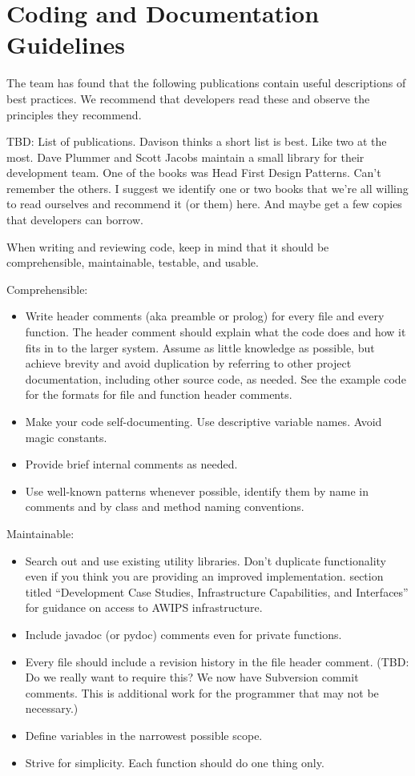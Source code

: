 
\chapter{Coding and Documentation Guidelines}


The team has found that the following publications contain 
useful descriptions of best practices.  We recommend that 
developers read these and observe the principles they
recommend.

TBD: List of publications.  Davison thinks a short list is
best.  Like two at the most.  Dave Plummer and Scott Jacobs 
maintain a small library for their development team.  One of
the books was Head First Design Patterns.  Can't remember
the others.  I suggest we identify one or two books that we're all 
willing to read ourselves and recommend it (or them) here.
And maybe get a few copies that developers can borrow.


When writing and reviewing code, keep in mind that it should
be comprehensible, maintainable, testable, and usable.

Comprehensible:
\begin{itemize}
\item
Write header comments (aka preamble or prolog) for every file and every
function.  The header comment should
explain what the code does and how it fits in to the larger system.
Assume as little knowledge as possible, but achieve brevity
and avoid duplication by referring to other project
documentation, including other source code, as needed.
See the example code for the formats for file and function 
header comments.
\item
Make your code self-documenting.  Use descriptive variable
names.  Avoid magic constants.
\item
Provide brief internal comments as needed.  
\item
Use well-known patterns whenever possible, identify them
by name in comments and by class and method naming
conventions.
\end{itemize}


Maintainable:
\begin{itemize}
\item
Search out and use existing utility libraries.
Don't duplicate functionality even if you think you are providing
an improved implementation.
section titled ``Development Case Studies, Infrastructure Capabilities,
and Interfaces'' for guidance on access to
AWIPS infrastructure.
\item
Include javadoc (or pydoc) comments even for private functions.  
\item
Every file should include a revision history in the file
header comment.  (TBD: Do we really want to require this?  We now 
have Subversion
commit comments.  This is additional work for the programmer
that may not be necessary.)
\item
Define variables in the narrowest possible scope.  
\item
Strive for simplicity.  Each function should do one thing only.
\end{itemize}

